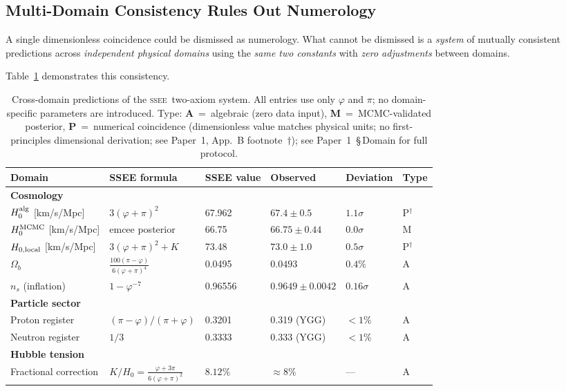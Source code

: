\documentclass[12pt,a4paper]{article}
\newcommand{\SSEE}{\ifmmode\mathrm{SSEE}\else\textsc{ssee}\fi}
\begin{document}
\subsection{Multi-Domain Consistency Rules Out Numerology}
\label{sec:numerology}

A single dimensionless coincidence could be dismissed as numerology.
What cannot be dismissed is a \emph{system} of mutually consistent predictions
across \emph{independent physical domains} using the \emph{same two constants}
with \emph{zero adjustments} between domains.

Table~\ref{tab:cross} demonstrates this consistency.

\begin{table}[ht]
\centering
\caption{Cross-domain predictions of the \SSEE\ two-axiom system.
  All entries use only $\varphi$ and $\pi$; no domain-specific parameters
  are introduced. Type: \textbf{A}~=~algebraic (zero data input),
  \textbf{M}~=~MCMC-validated posterior,
  \textbf{P}~=~numerical coincidence (dimensionless value matches physical units;
  no first-principles dimensional derivation; see Paper~1, App.~B footnote~$\dagger$);
  see Paper~1~\S\,Domain for full protocol.}
\label{tab:cross}
\begin{tabular}{llllll}
\toprule
Domain & SSEE formula & SSEE value & Observed & Deviation & Type \\
\midrule
\textbf{Cosmology} & & & & & \\
\quad $H_0^{\rm alg}$ [km/s/Mpc] & $3(\varphi+\pi)^2$ & 67.962 & $67.4\pm0.5$ & $1.1\sigma$ & P$^\dagger$ \\
\quad $H_0^{\rm MCMC}$ [km/s/Mpc] & emcee posterior & 66.75 & $66.75\pm0.44$ & $0.0\sigma$ & M \\
\quad $H_{0,\rm local}$ [km/s/Mpc] & $3(\varphi+\pi)^2 + K$ & 73.48  & $73.0\pm1.0$ & $0.5\sigma$ & P$^\dagger$ \\
\quad $\Omega_b$ & $\frac{100(\pi-\varphi)}{6(\varphi+\pi)^4}$ & 0.0495 & $0.0493$ & $0.4\%$ & A \\
\quad $n_s$ (inflation) & $1-\varphi^{-7}$ & 0.96556 & $0.9649\pm0.0042$ & $0.16\sigma$ & A \\
\textbf{Particle sector} & & & & & \\
\quad Proton register & $(\pi-\varphi)/(\pi+\varphi)$ & 0.3201 & 0.319 (YGG) & $<1\%$ & A \\
\quad Neutron register & $1/3$ & 0.3333 & 0.333 (YGG) & $<1\%$ & A \\
\textbf{Hubble tension} & & & & & \\
\quad Fractional correction & $K/H_0 = \frac{\varphi+3\pi}{6(\varphi+\pi)^2}$ & $8.12\%$ & $\approx 8\%$ & — & A \\
\bottomrule
\end{tabular}
\end{table}
\end{document}
